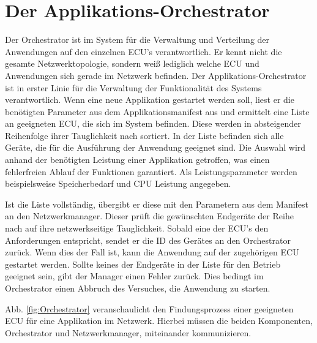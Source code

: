 \section{Der Applikations-Orchestrator}\label{sec:Orchestrator}
Der Orchestrator ist im System für die Verwaltung und Verteilung der Anwendungen auf den einzelnen \ac{ECU}'s verantwortlich. Er kennt nicht die gesamte Netzwerktopologie, sondern weiß lediglich welche \ac{ECU} und Anwendungen sich gerade im Netzwerk befinden. Der Applikations-Orchestrator ist in erster Linie für die Verwaltung der Funktionalität des Systems verantwortlich. Wenn eine neue Applikation gestartet werden soll, liest er die benötigten Parameter aus dem Applikationsmanifest aus und ermittelt eine Liste an geeigneten \ac{ECU}, die sich im System befinden. Diese werden in absteigender Reihenfolge ihrer Tauglichkeit nach sortiert. In der Liste befinden sich alle Geräte, die für die Ausführung der Anwendung geeignet sind. 
\newpage
Die Auswahl wird anhand der benötigten Leistung einer Applikation getroffen, was einen fehlerfreien Ablauf der Funktionen garantiert. Als Leistungsparameter werden beispielsweise Speicherbedarf und CPU Leistung angegeben. 

Ist die Liste vollständig, übergibt er diese mit den Parametern aus dem Manifest an den Netzwerkmanager. Dieser prüft die gewünschten Endgeräte der Reihe nach auf ihre netzwerkseitige Tauglichkeit. Sobald eine der \ac{ECU}'s den Anforderungen entspricht, sendet er die \ac{ID} des Gerätes an den Orchestrator zurück. Wenn dies der Fall ist, kann die Anwendung auf der zugehörigen \ac{ECU} gestartet werden. Sollte keines der Endgeräte in der Liste für den Betrieb geeignet sein, gibt der Manager einen Fehler zurück. Dies bedingt im Orchestrator einen Abbruch des Versuches, die  Anwendung zu starten.

Abb. \ref{fig:Orchestrator} veranschaulicht den Findungsprozess einer geeigneten \ac{ECU} für eine Applikation im Netzwerk. Hierbei müssen die beiden Komponenten, Orchestrator und Netzwerkmanager, miteinander kommunizieren.


\newpage